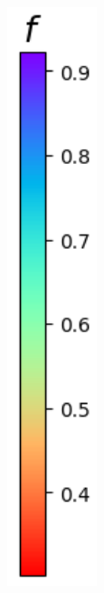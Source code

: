 \documentclass[12pt]{standalone}
\begin{document}
\begin{figure}
\begin{subfigure}{0.9\textwidth}
\end{subfigure}%
\begin{subfigure}{0.1\textwidth}
\includegraphics[width=.8\columnwidth]{col-2.png} \\ [2ex]
\end{subfigure}
\end{figure}
\end{document}
